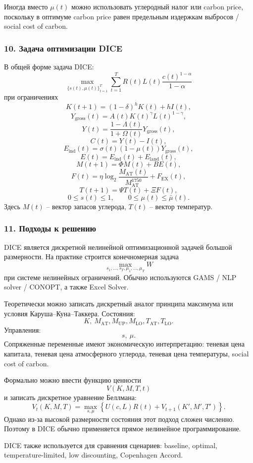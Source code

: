 \documentclass[12pt,a4paper]{article}
\begin{document}
Иногда вместо $\mu(t)$ можно использовать углеродный налог или carbon price, поскольку в оптимуме carbon price равен предельным издержкам выбросов / social cost of carbon.

\subsubsection*{10. Задача оптимизации DICE}
В общей форме задача DICE:
\[
\max_{\{s(t),\mu(t)\}_{t=1}^{T}}\sum_{t=1}^{T}R(t)L(t)\frac{c(t)^{1-\alpha}}{1-\alpha}
\]
при ограничениях
\[
K(t+1)=(1-\delta)^hK(t)+hI(t),
\]
\[
Y_{\mathrm{gross}}(t)=A(t)K(t)^\gamma L(t)^{1-\gamma},
\]
\[
Y(t)=\frac{1-\Lambda(t)}{1+\Omega(t)}Y_{\mathrm{gross}}(t),
\]
\[
C(t)=Y(t)-I(t),
\]
\[
E_{\mathrm{ind}}(t)=\sigma(t)(1-\mu(t))Y_{\mathrm{gross}}(t),
\]
\[
E(t)=E_{\mathrm{ind}}(t)+E_{\mathrm{land}}(t),
\]
\[
M(t+1)=\Phi M(t)+BE(t),
\]
\[
F(t)=\eta\log_2\frac{M_{\mathrm{AT}}(t)}{M_{\mathrm{AT}}^{1750}}+F_{\mathrm{EX}}(t),
\]
\[
T(t+1)=\Psi T(t)+\Xi F(t),
\]
\[
0\le s(t)\le 1,\qquad 0\le \mu(t)\le \bar\mu(t).
\]
Здесь $M(t)$ -- вектор запасов углерода, $T(t)$ -- вектор температур.

\subsubsection*{11. Подходы к решению}
DICE является дискретной нелинейной оптимизационной задачей большой размерности. На практике строится конечномерная задача
\[
\max_{s_1,\ldots,s_T,\mu_1,\ldots,\mu_T}W
\]
при системе нелинейных ограничений. Обычно используются GAMS / NLP solver / CONOPT, а также Excel Solver.

Теоретически можно записать дискретный аналог принципа максимума или условия Каруша--Куна--Таккера. Состояния:
\[
K,\ M_{\mathrm{AT}},M_{\mathrm{UP}},M_{\mathrm{LO}},T_{\mathrm{AT}},T_{\mathrm{LO}}.
\]
Управления:
\[
s,\ \mu.
\]
Сопряженные переменные имеют экономическую интерпретацию: теневая цена капитала, теневая цена атмосферного углерода, теневая цена температуры, social cost of carbon.

Формально можно ввести функцию ценности
\[
V(K,M,T,t)
\]
и записать дискретное уравнение Беллмана:
\[
V_t(K,M,T)=\max_{s,\mu}\left\{U(c,L)R(t)+V_{t+1}(K',M',T')\right\}.
\]
Однако из-за высокой размерности состояния этот подход сложен численно. Поэтому в DICE обычно применяется прямое нелинейное программирование.

DICE также используется для сравнения сценариев: baseline, optimal, temperature-limited, low discounting, Copenhagen Accord.
\end{document}
